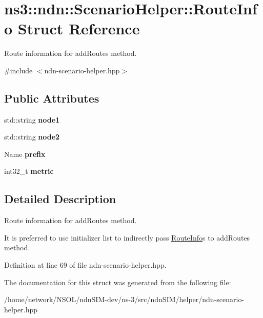 \hypertarget{structns3_1_1ndn_1_1ScenarioHelper_1_1RouteInfo}{}\section{ns3\+:\+:ndn\+:\+:Scenario\+Helper\+:\+:Route\+Info Struct Reference}
\label{structns3_1_1ndn_1_1ScenarioHelper_1_1RouteInfo}


Route information for add\+Routes method.  




{\ttfamily \#include $<$ndn-\/scenario-\/helper.\+hpp$>$}

\subsection*{Public Attributes}
\begin{DoxyCompactItemize}
\item 
std\+::string {\bfseries node1}\hypertarget{structns3_1_1ndn_1_1ScenarioHelper_1_1RouteInfo_a2ec5edf68ea520949f00cdf15c8b3d65}{}\label{structns3_1_1ndn_1_1ScenarioHelper_1_1RouteInfo_a2ec5edf68ea520949f00cdf15c8b3d65}

\item 
std\+::string {\bfseries node2}\hypertarget{structns3_1_1ndn_1_1ScenarioHelper_1_1RouteInfo_ab988cf7fdca6fffaf18a4f0e16f4027a}{}\label{structns3_1_1ndn_1_1ScenarioHelper_1_1RouteInfo_ab988cf7fdca6fffaf18a4f0e16f4027a}

\item 
Name {\bfseries prefix}\hypertarget{structns3_1_1ndn_1_1ScenarioHelper_1_1RouteInfo_ae2e1f3b42d9358390350a6e4620931b5}{}\label{structns3_1_1ndn_1_1ScenarioHelper_1_1RouteInfo_ae2e1f3b42d9358390350a6e4620931b5}

\item 
int32\+\_\+t {\bfseries metric}\hypertarget{structns3_1_1ndn_1_1ScenarioHelper_1_1RouteInfo_abf1b796b6ee34d68f5491669c84775be}{}\label{structns3_1_1ndn_1_1ScenarioHelper_1_1RouteInfo_abf1b796b6ee34d68f5491669c84775be}

\end{DoxyCompactItemize}


\subsection{Detailed Description}
Route information for add\+Routes method. 

It is preferred to use initializer list to indirectly pass \hyperlink{structns3_1_1ndn_1_1ScenarioHelper_1_1RouteInfo}{Route\+Info}\textquotesingle{}s to add\+Routes method. 

Definition at line 69 of file ndn-\/scenario-\/helper.\+hpp.



The documentation for this struct was generated from the following file\+:\begin{DoxyCompactItemize}
\item 
/home/network/\+N\+S\+O\+L/ndn\+S\+I\+M-\/dev/ns-\/3/src/ndn\+S\+I\+M/helper/ndn-\/scenario-\/helper.\+hpp\end{DoxyCompactItemize}
